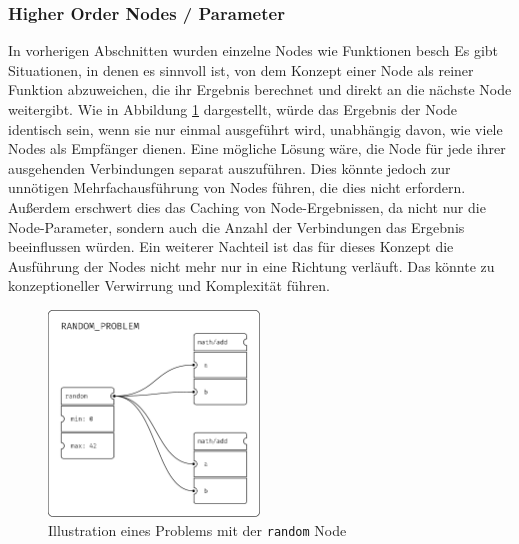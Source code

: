 \documentclass[ngerman]{article}
\begin{document}
\subsubsection{Higher Order Nodes / Parameter}
\label{sec:HON}
\linebreak
\linebreak
In vorherigen Abschnitten wurden einzelne Nodes wie Funktionen besch
Es gibt Situationen, in denen es sinnvoll ist, von dem Konzept einer Node als reiner Funktion abzuweichen, die ihr Ergebnis berechnet und direkt an die nächste Node weitergibt.
\linebreak
\linebreak
Wie in Abbildung \ref{fig:random_problem} dargestellt, würde das Ergebnis der  Node identisch sein, wenn sie nur einmal ausgeführt wird, unabhängig davon, wie viele  Nodes als Empfänger dienen. 
Eine mögliche Lösung wäre, die  Node für jede ihrer ausgehenden Verbindungen separat auszuführen. 
Dies könnte jedoch zur unnötigen Mehrfachausführung von Nodes führen, die dies nicht erfordern.
Außerdem erschwert dies das Caching von Node-Ergebnissen, da nicht nur die Node-Parameter, sondern auch die Anzahl der Verbindungen das Ergebnis beeinflussen würden.
\linebreak
\linebreak
Ein weiterer Nachteil ist das für dieses Konzept die Ausführung der Nodes nicht mehr nur in eine Richtung verläuft. Das könnte zu konzeptioneller Verwirrung und Komplexität führen.
\linebreak
\linebreak
\begin{figure}[htbp]
  \centering
  \includegraphics[width=0.5\textwidth]{graphics/RANDOM_PROBLEM.pdf}
  \caption{Illustration eines Problems mit der \texttt{random} Node}
  \label{fig:random_problem}
\end{figure}
\end{document}
